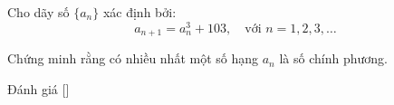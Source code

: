 \ifshowproblem
\begin{problem}\label{problem:TWN-2015-TST2-Q2-P1}
    Cho dãy số \( \{a_n\} \) xác định bởi:
    \[
        a_{n+1} = a_n^3 + 103,\quad \text{với } n = 1, 2, 3, \dots
    \]
    
    Chứng minh rằng có nhiều nhất một số hạng \( a_n \) là số chính phương.
\end{problem}
\fi

\ifshowinfo
Đánh giá [\textbf{}]\footnotemark
{}
\fi